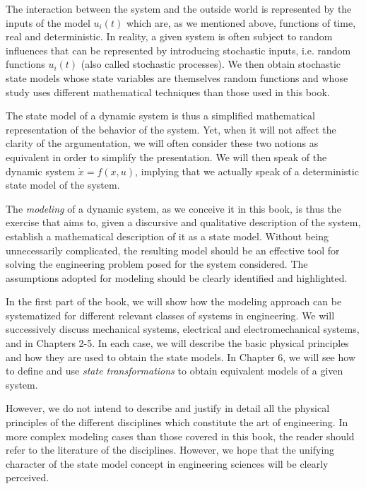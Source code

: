 The interaction between the system and the \og outside world \gf is represented by the inputs of the model $u_i(t)$ which are, as we mentioned above, functions of time, real and deterministic. In reality, a given system is often subject to random influences that can be represented by introducing stochastic inputs, i.e. random functions $u_i(t) $ (also called stochastic processes). We then obtain stochastic state models whose state variables are themselves random functions and whose study uses different mathematical techniques than those used in this book.

The state model of a dynamic system is thus a simplified mathematical representation of the behavior of the system. Yet, when it will not affect the clarity of the argumentation, we will often consider these two notions as equivalent in order to simplify the presentation. We will then speak of the dynamic system $\dot x = f(x,u)$, implying that we actually speak of a deterministic state model of the system.

The {\it modeling} of a dynamic system, as we conceive it in this book, is thus the exercise that aims to, given a discursive and qualitative description of the system, establish a mathematical description of it as a state model. Without being unnecessarily complicated, the resulting model should be an effective tool for solving the engineering problem posed for the system considered. The assumptions adopted for modeling should be clearly identified and highlighted.

In the first part of the book, we will show
how the modeling approach can be systematized for different
relevant classes of systems in engineering. We will successively discuss mechanical systems, electrical and electromechanical systems,
 and  in Chapters 2-5. In each case, we will 
describe the basic physical principles and how they are
used to obtain the state models. In Chapter 6, we will see how to define and use {\it state transformations} to obtain equivalent models of a given system.

However, we do not intend to describe and justify in detail all the physical principles of the different disciplines which constitute the art of engineering. In more complex modeling cases than those covered in this book, the reader should refer to the literature of the disciplines. However, we hope that the unifying character of the state model concept in engineering sciences will be clearly perceived.


